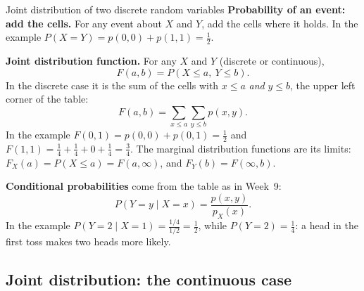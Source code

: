 \begin{key}{Joint distribution of two discrete random variables}
	\textbf{Probability of an event: add the cells.} For any event about $X$
	and $Y$, add the cells where it holds. In the example
	$P(X=Y)=p(0,0)+p(1,1)=\frac12$.

	\textbf{Joint distribution function.} For any $X$ and $Y$ (discrete or
	continuous),
	\[ F(a,b)=P(X\le a,\ Y\le b). \]
	In the discrete case it is the sum of the cells with $x\le a$ \emph{and}
	$y\le b$, the upper left corner of the table:
	\[ F(a,b)=\sum_{x\le a}\sum_{y\le b}p(x,y). \]
	In the example $F(0,1)=p(0,0)+p(0,1)=\frac12$ and
	$F(1,1)=\frac14+\frac14+0+\frac14=\frac34$. The marginal distribution
	functions are its limits: $F_X(a)=P(X\le a)=F(a,\infty)$, and
	$F_Y(b)=F(\infty,b)$.

	\textbf{Conditional probabilities} come from the table as in Week~9:
	\[ P(Y=y\mid X=x)=\frac{p(x,y)}{p_X(x)}. \]
	In the example $P(Y=2\mid X=1)=\frac{1/4}{1/2}=\frac12$, while
	$P(Y=2)=\frac14$: a head in the first toss makes two heads more likely.
\end{key}


\subsection*{Joint distribution: the continuous case}

